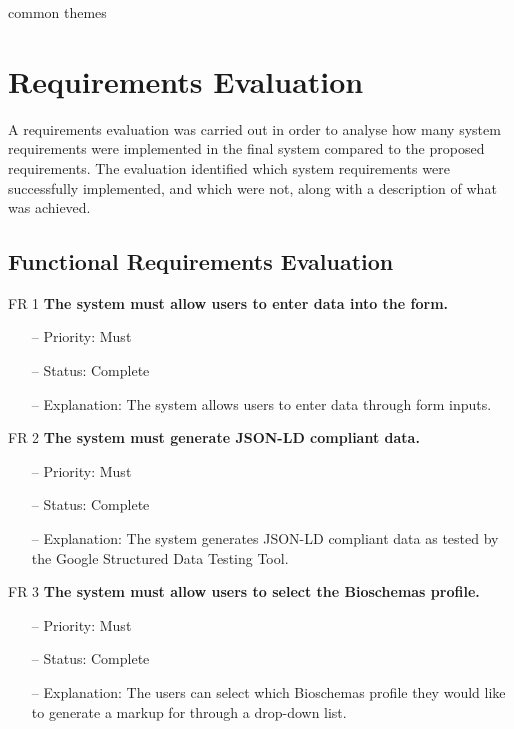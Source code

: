 common themes





\newpage
\section{Requirements Evaluation}
A requirements evaluation was carried out in order to analyse how many system requirements were implemented in the final system compared to the proposed requirements. The evaluation identified which system requirements were successfully implemented, and which were not, along with a description of what was achieved. 
\subsection{Functional Requirements Evaluation}

FR 1 \textbf{The system must allow users to enter data into the form.}
\begin{itemize}
\item[--] Priority: Must
\item[--] Status: Complete
\item[--] Explanation: The system allows users to enter data through form inputs.
\end{itemize}

\noindent
FR 2 \textbf{The system must generate JSON-LD compliant data.}
\begin{itemize}
\item[--] Priority: Must
\item[--] Status: Complete
\item[--] Explanation: The system generates JSON-LD compliant data as tested by the Google Structured Data Testing Tool.
\end{itemize}
\noindent
FR 3 \textbf{The system must allow users to select the Bioschemas profile.}
\begin{itemize}
\item[--] Priority: Must
\item[--] Status: Complete
\item[--] Explanation: The users can select which Bioschemas profile they would like to generate a markup for through a drop-down list.
\end{itemize}

